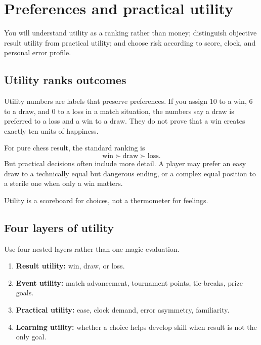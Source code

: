 \chapter{Preferences and practical utility}
\begin{learningbox}
You will understand utility as a ranking rather than money; distinguish objective result utility from practical utility; and choose risk according to score, clock, and personal error profile.
\end{learningbox}

\section{Utility ranks outcomes}
Utility numbers are labels that preserve preferences. If you assign 10 to a win, 6 to a draw, and 0 to a loss in a match situation, the numbers say a draw is preferred to a loss and a win to a draw. They do not prove that a win creates exactly ten units of happiness.

For pure chess result, the standard ranking is
\[
\text{win} \succ \text{draw} \succ \text{loss}.
\]
But practical decisions often include more detail. A player may prefer an easy draw to a technically equal but dangerous ending, or a complex equal position to a sterile one when only a win matters.

\begin{intuitionbox}
Utility is a scoreboard for choices, not a thermometer for feelings.
\end{intuitionbox}

\section{Four layers of utility}
Use four nested layers rather than one magic evaluation.

\begin{enumerate}[label=\textbf{\arabic*.},leftmargin=2.0em]
\item \textbf{Result utility:} win, draw, or loss.
\item \textbf{Event utility:} match advancement, tournament points, tie-breaks, prize goals.
\item \textbf{Practical utility:} ease, clock demand, error asymmetry, familiarity.
\item \textbf{Learning utility:} whether a choice helps develop skill when result is not the only goal.
\end{enumerate}

